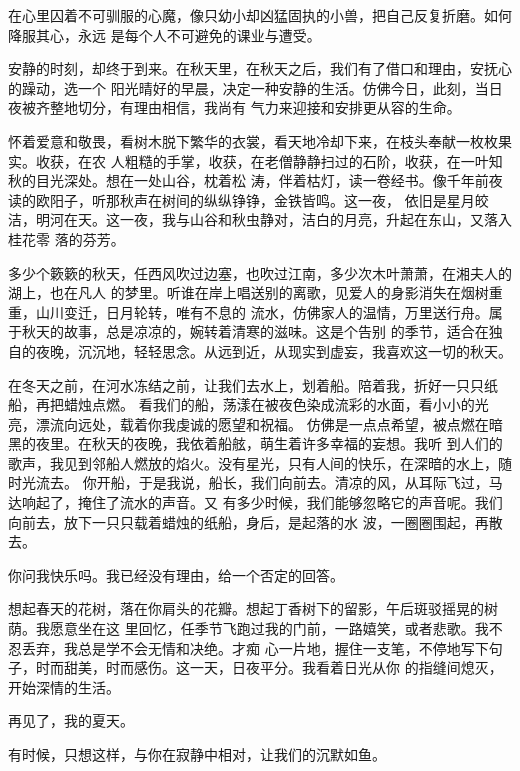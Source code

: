 		在心里囚着不可驯服的心魔，像只幼小却凶猛固执的小兽，把自己反复折磨。如何降服其心，永远
	是每个人不可避免的课业与遭受。

		安静的时刻，却终于到来。在秋天里，在秋天之后，我们有了借口和理由，安抚心的躁动，选一个
	阳光晴好的早晨，决定一种安静的生活。仿佛今日，此刻，当日夜被齐整地切分，有理由相信，我尚有
	气力来迎接和安排更从容的生命。

		怀着爱意和敬畏，看树木脱下繁华的衣裳，看天地冷却下来，在枝头奉献一枚枚果实。收获，在农
	人粗糙的手掌，收获，在老僧静静扫过的石阶，收获，在一叶知秋的目光深处。想在一处山谷，枕着松
	涛，伴着枯灯，读一卷经书。像千年前夜读的欧阳子，听那秋声在树间的纵纵铮铮，金铁皆鸣。这一夜，
	依旧是星月皎洁，明河在天。这一夜，我与山谷和秋虫静对，洁白的月亮，升起在东山，又落入桂花零
	落的芬芳。

		多少个簌簌的秋天，任西风吹过边塞，也吹过江南，多少次木叶萧萧，在湘夫人的湖上，也在凡人
	的梦里。听谁在岸上唱送别的离歌，见爱人的身影消失在烟树重重，山川变迁，日月轮转，唯有不息的
	流水，仿佛家人的温情，万里送行舟。属于秋天的故事，总是凉凉的，婉转着清寒的滋味。这是个告别
	的季节，适合在独自的夜晚，沉沉地，轻轻思念。从远到近，从现实到虚妄，我喜欢这一切的秋天。

		在冬天之前，在河水冻结之前，让我们去水上，划着船。陪着我，折好一只只纸船，再把蜡烛点燃。
	看我们的船，荡漾在被夜色染成流彩的水面，看小小的光亮，漂流向远处，载着你我虔诚的愿望和祝福。
	仿佛是一点点希望，被点燃在暗黑的夜里。在秋天的夜晚，我依着船舷，萌生着许多幸福的妄想。我听
	到人们的歌声，我见到邻船人燃放的焰火。没有星光，只有人间的快乐，在深暗的水上，随时光流去。
	你开船，于是我说，船长，我们向前去。清凉的风，从耳际飞过，马达响起了，掩住了流水的声音。又
	有多少时候，我们能够忽略它的声音呢。我们向前去，放下一只只载着蜡烛的纸船，身后，是起落的水
	波，一圈圈围起，再散去。

		你问我快乐吗。我已经没有理由，给一个否定的回答。

		想起春天的花树，落在你肩头的花瓣。想起丁香树下的留影，午后斑驳摇晃的树荫。我愿意坐在这
	里回忆，任季节飞跑过我的门前，一路嬉笑，或者悲歌。我不忍丢弃，我总是学不会无情和决绝。才痴
	心一片地，握住一支笔，不停地写下句子，时而甜美，时而感伤。这一天，日夜平分。我看着日光从你
	的指缝间熄灭，开始深情的生活。

		再见了，我的夏天。

	\endwriting



		有时候，只想这样，与你在寂静中相对，让我们的沉默如鱼。


